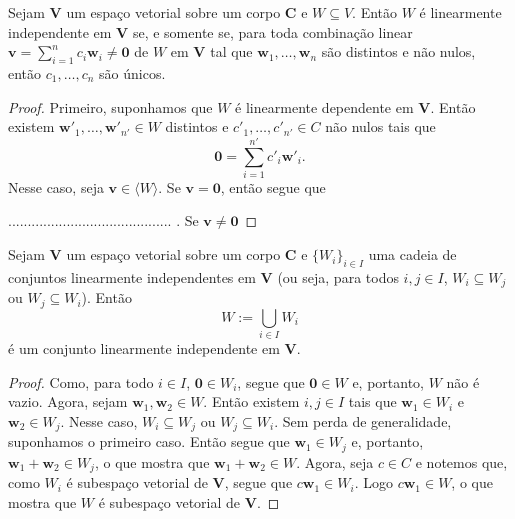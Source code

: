 \begin{proposition}
	Sejam $\bm V$ um espaço vetorial sobre um corpo $\bm C$ e $W \subseteq V$. Então $W$ é linearmente independente em $\bm V$ se, e somente se, para toda combinação linear $\bm v = \sum_{i=1}^n c_i\bm w_i \neq \bm 0$ de $W$ em $\bm V$ tal que $\bm w_1,\ldots,\bm w_n$ são distintos e não nulos, então $c_1,\ldots,c_n$ são únicos.
\end{proposition}
\begin{proof}
	Primeiro, suponhamos que $W$ é linearmente dependente em $\bm V$. Então existem $\bm w'_1, \ldots,\bm w'_{n'} \in W$ distintos e $c'_1,\ldots,c'_{n'} \in C$ não nulos tais que
	\begin{equation*}
	\bm 0 = \sum_{i=1}^{n'} c'_i\bm w'_i.
	\end{equation*}
Nesse caso, seja $\bm v \in \langle W \rangle$. Se $\bm v = \bm 0$, então segue que









 .......................................... . Se $\bm v \neq \bm 0$










\end{proof}

\begin{proposition}
	Sejam $\bm V$ um espaço vetorial sobre um corpo $\bm C$ e $\{W_i\}_{i \in I}$ uma cadeia de conjuntos linearmente independentes em $\bm V$ (ou seja, para todos $i,j \in I$, $W_i \subseteq W_j$ ou $W_j \subseteq W_i$). Então
	\begin{equation*}
	W := \bigcup_{i \in I} W_i
	\end{equation*}
é um conjunto linearmente independente em $\bm V$.
\end{proposition}
\begin{proof}
	Como, para todo $i \in I$, $\bm 0 \in W_i$, segue que $\bm 0 \in W$ e, portanto, $W$ não é vazio. Agora, sejam $\bm w_1,\bm w_2 \in W$. Então existem $i,j \in I$ tais que $\bm w_1 \in W_i$ e $\bm w_2 \in W_j$. Nesse caso, $W_i \subseteq W_j$ ou $W_j \subseteq W_i$. Sem perda de generalidade, suponhamos o primeiro caso. Então segue que $\bm w_1 \in W_j$ e, portanto, $\bm w_1+\bm w_2 \in W_j$, o que mostra que $\bm w_1+\bm w_2 \in W$. Agora, seja $c \in C$ e notemos que, como $W_i$ é subespaço vetorial de $\bm V$, segue que $c\bm w_1 \in W_i$. Logo $c\bm w_1 \in W$, o que mostra que $W$ é subespaço vetorial de $\bm V$.
\end{proof}


